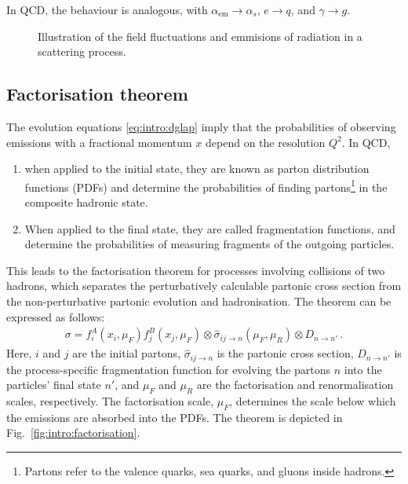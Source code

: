 In QCD, the behaviour is analogous, with $\alpha_\mathrm{em} \rightarrow \alpha_s$, $e\rightarrow q$, and $\gamma \rightarrow g$. 

\begin{figure}[H]
\caption{Illustration of the field fluctuations and emmisions of radiation in a scattering process.}
\label{fig:intro:isrfsrsketch}
\end{figure}

\subsection{Factorisation theorem}

The evolution equations \ref{eq:intro:dglap} imply that the probabilities of observing emissions with a fractional momentum $x$ depend on the resolution $Q^2$. In QCD, 
\begin{enumerate}
\item when applied to the initial state, they are known as parton distribution functions (PDFs) and determine the probabilities of finding partons\footnote{Partons refer to the valence quarks, sea quarks, and gluons inside hadrons.} in the composite hadronic state. 
\item When applied to the final state, they are called fragmentation functions, and determine the probabilities of measuring fragments of the outgoing particles.
\end{enumerate}

This leads to the factorisation theorem for processes involving collisions of two hadrons, which separates the perturbatively calculable partonic cross section from the non-perturbative partonic evolution and hadronisation. The theorem can be expressed as follows:
\begin{align}
\sigma = f_i^A(x_i,\mu_F)f_j^B(x_j,\mu_F) \otimes \hat{\sigma}_{ij\to n}(\mu_F,\mu_R) \otimes D_{n \to n'} \, .
\end{align}
Here, $i$ and $j$ are the initial partons, $\hat{\sigma}_{ij\to n}$ is the partonic cross section, $D_{n \to n'}$ is the process-specific fragmentation function for evolving the partons $n$ into the particles' final state $n'$, and $\mu_F$ and $\mu_R$ are the factorisation and renormalisation scales, respectively. The factorisation scale, $\mu_F$, determines the scale below which the emissions are absorbed into the PDFs. The theorem is depicted in Fig.~\ref{fig:intro:factorisation}.

